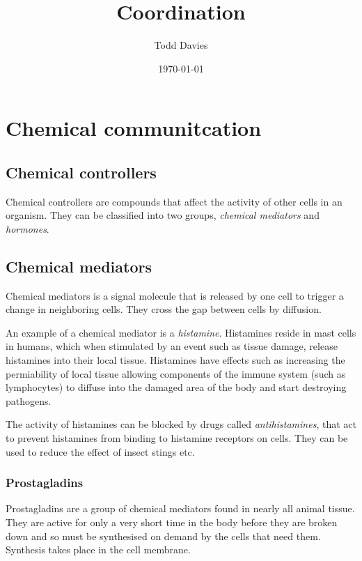 \documentclass{article}
\title{Coordination}
\author{Todd Davies}
\date{\today}
\begin{document}
\lhead{\today}

\maketitle

\section*{Chemical communitcation}
\thispagestyle{empty}

\subsection*{Chemical controllers}

Chemical controllers are compounds that affect the activity of other cells in an
organism. They can be classified into two groups, {\it chemical mediators} and
{\it hormones}.

\subsection*{Chemical mediators}

Chemical mediators is a signal molecule that is released by one cell to trigger
a change in neighboring cells. They cross the gap between cells by diffusion.

An example of a chemical mediator is a {\it histamine}. Histamines reside in
mast cells in humans, which when stimulated by an event such as tissue damage,
release histamines into their local tissue. Histamines have effects such as
increasing the permiability of local tissue allowing components of the immune
system (such as lymphocytes) to diffuse into the damaged area of the body and
start destroying pathogens.

The activity of histamines can be blocked by drugs called {\it antihistamines},
that act to prevent histamines from binding to histamine receptors on cells.
They can be used to reduce the effect of insect stings etc.

\subsubsection*{Prostagladins}

Prostagladins are a group of chemical mediators found in nearly all animal
tissue. They are active for only a very short time in the body before they are
broken down and so must be synthesised on demand by the cells that need them.
Synthesis takes place in the cell membrane.
\end{document}
